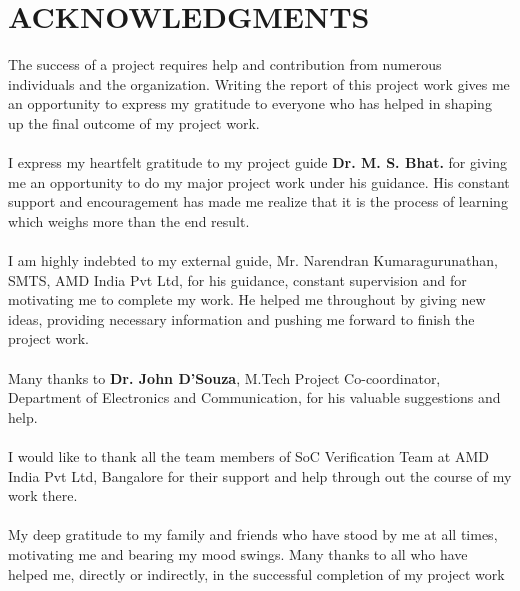 \section*{\centering ACKNOWLEDGMENTS}
The success of a project requires help and contribution from numerous individuals and 
the organization. Writing the report of this project work gives me an opportunity to 
express my gratitude to everyone who has helped in shaping up the final outcome of my 
project work.
 \paragraph{} I express my heartfelt gratitude to my project guide {\bf Dr. M. S. Bhat.} for 
giving me an opportunity to do my major project work under his guidance. His constant 
support and encouragement has made me realize that it is the process of learning which 
weighs more than the end result.

\paragraph{}I am highly indebted to my external guide, Mr. Narendran Kumaragurunathan, SMTS, AMD India Pvt Ltd, for
his guidance, constant supervision and for motivating me to complete my work.
He helped me throughout by giving new ideas, providing necessary information and
pushing me forward to finish the project work. 

\paragraph{} Many thanks to {\bf Dr. John D'Souza}, M.Tech Project Co-coordinator, Department of 
Electronics and Communication, for his valuable suggestions and help.
\paragraph{} I would like to thank all the team members of SoC Verification Team at AMD India Pvt Ltd, Bangalore for their support and help through out the course of my work there.
\paragraph{} My deep gratitude to my family and friends who have stood by me at all times, motivating 
me and bearing my mood swings. Many thanks to all who have helped me, directly or indirectly, in 
the successful completion of my project work
